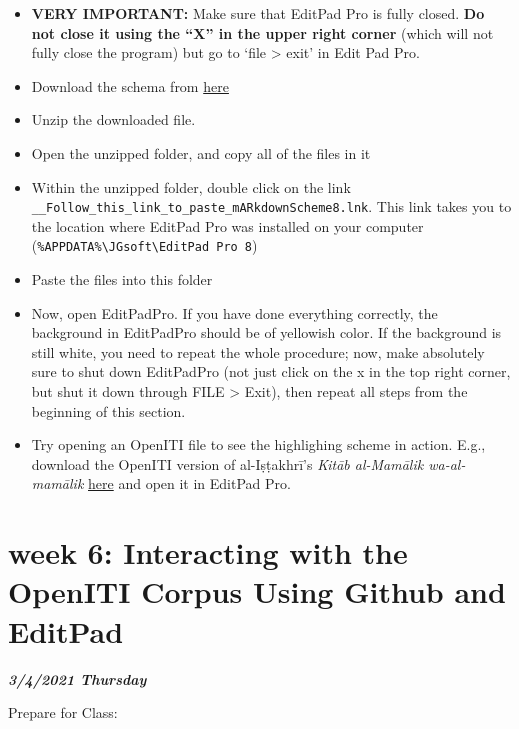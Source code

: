 \documentclass[
]{book}
\providecommand{\tightlist}{%
  \setlength{\itemsep}{0pt}\setlength{\parskip}{0pt}}
\begin{document}
\begin{itemize}
\tightlist
\item
  \textbf{VERY IMPORTANT:} Make sure that EditPad Pro is fully closed. \textbf{Do not close it using the ``X'' in the upper right corner} (which will not fully close the program) but go to `file \textgreater{} exit' in Edit Pad Pro.
\item
  Download the schema from \href{./2021IslamicateWorldCourse_files/EditPadPro8_20210118_144130.zip}{here}
\item
  Unzip the downloaded file.
\item
  Open the unzipped folder, and copy all of the files in it
\item
  Within the unzipped folder, double click on the link \texttt{\_\_Follow\_this\_link\_to\_paste\_mARkdownScheme8.lnk}. This link takes you to the location where EditPad Pro was installed on your computer (\texttt{\%APPDATA\%\textbackslash{}JGsoft\textbackslash{}EditPad\ Pro\ 8})
\item
  Paste the files into this folder
\item
  Now, open EditPadPro. If you have done everything correctly, the background in EditPadPro should be of yellowish color. If the background is still white, you need to repeat the whole procedure; now, make absolutely sure to shut down EditPadPro (not just click on the x in the top right corner, but shut it down through FILE \textgreater{} Exit), then repeat all steps from the beginning of this section.
\item
  Try opening an OpenITI file to see the highlighing scheme in action. E.g., download the OpenITI version of al-Iṣṭakhrī's \emph{Kitāb al-Mamālik wa-al-mamālik} \href{./2021IslamicateWorldCourse_files/0346Istakhri.MasalikWaMamalik.Shamela0011680-ara1.mARkdown}{here} and open it in EditPad Pro.
\end{itemize}

\hypertarget{week-6-interacting-with-the-openiti-corpus-using-github-and-editpad-1}{%
\chapter{week 6: Interacting with the OpenITI Corpus Using Github and EditPad}\label{week-6-interacting-with-the-openiti-corpus-using-github-and-editpad-1}}

\textbf{\emph{3/4/2021 Thursday}}

Prepare for Class:
\end{document}
